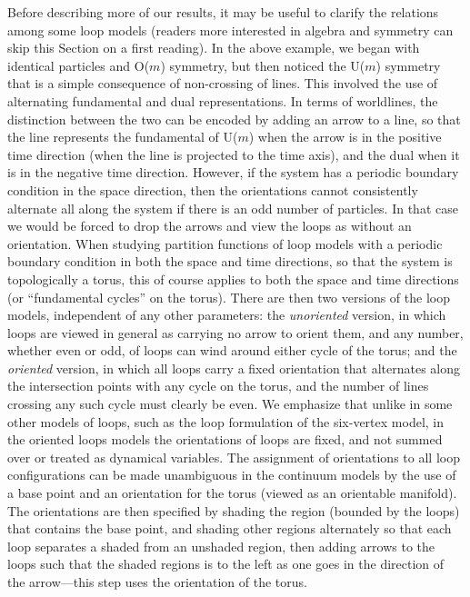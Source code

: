 \documentclass[twocolumn,floats,pra]{revtex4}
\begin{document}
Before describing more of our results, it may be useful to clarify
the relations among some loop models (readers more interested in
algebra and symmetry can skip this Section on a first reading). In
the above example, we began with identical particles and O($m$)
symmetry, but then noticed the U($m$) symmetry that is a simple
consequence of non-crossing of lines. This involved the use of
alternating fundamental and dual representations. In terms of
worldlines, the distinction between the two can be encoded by
adding an arrow to a line, so that the line represents the
fundamental of U($m$) when the arrow is in the positive time
direction (when the line is projected to the time axis), and the
dual when it is in the negative time direction. However, if the
system has a periodic boundary condition in the space direction,
then the orientations cannot consistently alternate all along the
system if there is an odd number of particles. In that case we
would be forced to drop the arrows and view the loops as without
an orientation. When studying partition functions of loop models
with a periodic boundary condition in both the space and time
directions, so that the system is topologically a torus, this of
course applies to both the space and time directions (or
``fundamental cycles'' on the torus). There are then two versions
of the loop models, independent of any other parameters: the {\em
unoriented} version, in which loops are viewed in general as
carrying no arrow to orient them, and any number, whether even or
odd, of loops can wind around either cycle of the torus; and the
{\em oriented} version, in which all loops carry a fixed
orientation that alternates along the intersection points with any
cycle on the torus, and the number of lines crossing any such
cycle must clearly be even. We emphasize that unlike in some other
models of loops, such as the loop formulation of the six-vertex
model, in the oriented loops models the orientations of loops are
fixed, and not summed over or treated as dynamical variables. The
assignment of orientations to all loop configurations can be made
unambiguous in the continuum models by the use of a base point and
an orientation for the torus (viewed as an orientable manifold).
The orientations are then specified by shading the region (bounded
by the loops) that contains the base point, and shading other
regions alternately so that each loop separates a shaded from an
unshaded region, then adding arrows to the loops such that the
shaded regions is to the left as one goes in the direction of the
arrow---this step uses the orientation of the torus.
\end{document}

